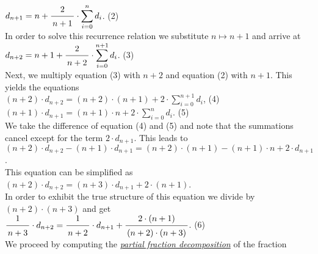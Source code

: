 \\[0.2cm]
\hspace*{1.3cm}
$\displaystyle d_{n+1} = n + \bruch{2}{n+1} \cdot \sum\limits_{i=0}^n d_i$. \hspace*{\fill} (2)
\\[0.2cm] 
In order to solve this recurrence relation we substitute $n \mapsto n+1$ and arrive at
\\[0.2cm]
\hspace*{1.3cm}
$\displaystyle d_{n+2} = n+1 + \bruch{2}{n+2} \cdot \sum\limits_{i=0}^{n+1} d_i$.  \hspace*{\fill} (3)
\\[0.2cm]
Next, we multiply equation (3) with $n+2$ and equation (2) with $n+1$.  This yields the equations
\\[0.2cm]
\hspace*{1.3cm}
$(n+2)\cdot d_{n+2} = (n+2)\cdot(n+1) + 2 \cdot \sum\limits_{i=0}^{n+1} d_i$,
\hspace*{\fill} (4) \\[0.2cm]
\hspace*{1.3cm}
$(n+1)\cdot d_{n+1}  =  (n+1)\cdot n + 2 \cdot \sum\limits_{i=0}^n d_i$.  
\hspace*{\fill} (5) \\[0.2cm]
We take the difference of  equation (4) and (5) and note that the summations cancel except for
the term $2\cdot d_{n+1}$.  This leads to
\\[0.2cm]
\hspace*{1.3cm}
$(n+2)\cdot d_{n+2} - (n+1)\cdot \displaystyle d_{n+1} = (n+2)\cdot(n+1) - (n+1)\cdot n+2 \cdot d_{n+1}$.
\\[0.2cm] 
This equation can be simplified as
\\[0.2cm]
\hspace*{1.3cm}
$(n+2)\cdot d_{n+2} = (n+3)\cdot \displaystyle d_{n+1} + 2\cdot(n+1)$.
\\[0.2cm] 
In order to exhibit the true structure of this equation we divide by $(n+2) \cdot(n+3)$ and
get 
\\[0.2cm]
\hspace*{1.3cm}
$\bruch{1}{n+3} \cdot d_{n+2} = \bruch{1}{n+2}\cdot d_{n+1} + \bruch{2\cdot(n+1)}{(n+2)\cdot(n+3)}$.
\hspace*{\fill} (6) 
\\[0.2cm]
We proceed by computing the 
\href{http://en.wikipedia.org/wiki/Partial_fraction}{\emph{partial fraction decomposition}}
of the fraction
\\[0.2cm]
\hspace*{1.3cm}
